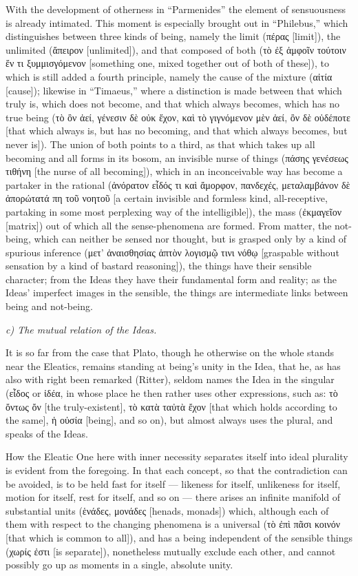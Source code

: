 \documentclass[12pt]{book}
\begin{document}
With the development of otherness in ``Parmenides'' the element of sensuousness is already
intimated. This moment is
especially brought out in ``Philebus,'' which distinguishes between three kinds of being, namely the
limit (πέρας [limit]), the unlimited (ἄπειρον [unlimited]), and that composed of both (τὸ ἐξ ἀμφοῖν
τούτοιν ἕν τι ξυμμισγόμενον [something one, mixed together out of both of these]), to which is still
added a fourth principle, namely the cause of the mixture (αἰτία [cause]); likewise in ``Timaeus,''
where a distinction is made between that which truly is, which does not become, and that which always
becomes, which has no true being (τὸ ὂν ἀεί, γένεσιν δὲ οὐκ ἔχον, καὶ τὸ γιγνόμενον μὲν ἀεί, ὂν δὲ
οὐδέποτε [that which always is, but has no becoming, and that which always becomes, but never is]).
The union of both points to a third, as that which takes up all becoming and all forms in its bosom,
an invisible nurse of things (πάσης γενέσεως τιθήνη [the nurse of all becoming]), which in an
inconceivable way has become a partaker in the rational (ἀνόρατον εἶδός τι καὶ ἄμορφον, πανδεχές,
μεταλαμβάνον δὲ ἀπορώτατά πη τοῦ νοητοῦ [a certain invisible and formless kind, all-receptive,
partaking in some most perplexing way of the intelligible]), the mass (ἐκμαγεῖον [matrix]) out of
which all the sense-phenomena are formed. From matter, the not-being, which can neither be sensed nor
thought, but is grasped only by a kind of spurious inference (μετ' ἀναισθησίας ἁπτὸν λογισμῷ τινι
νόθῳ [graspable without sensation by a kind of bastard reasoning]), the things have their sensible
character; from the Ideas they have their fundamental form and reality; as the Ideas' imperfect
images in the sensible, the things are intermediate links between being and not-being.

\emph{c) The mutual relation of the Ideas.}

It is so far from the case that Plato, though he otherwise on the whole stands near the Eleatics,
remains standing at being's unity in the Idea, that he, as has also with right been remarked (Ritter),
seldom names the Idea in the singular (εἶδος or ἰδέα, in whose place he then rather uses other
expressions, such as: τὸ ὄντως ὄν [the truly-existent], τὸ κατὰ ταὐτὰ ἔχον [that which holds according
to the same], ἡ οὐσία [being], and so on), but almost always uses the plural, and speaks of the Ideas.

How the Eleatic One here with inner necessity separates itself into ideal plurality is evident from
the foregoing. In that each concept, so that the contradiction can be avoided, is to be held fast
for itself — likeness for itself, unlikeness for itself, motion for itself, rest for itself, and so
on — there arises an infinite
manifold of substantial units (ἑνάδες, μονάδες [henads, monads]) which, although each of them with
respect to the changing phenomena is a universal (τὸ ἐπὶ πᾶσι κοινόν [that which is common to all]),
and has a being independent of the sensible things (χωρίς ἐστι [is separate]), nonetheless mutually
exclude each other, and cannot possibly go up as moments in a single, absolute unity.
\end{document}
